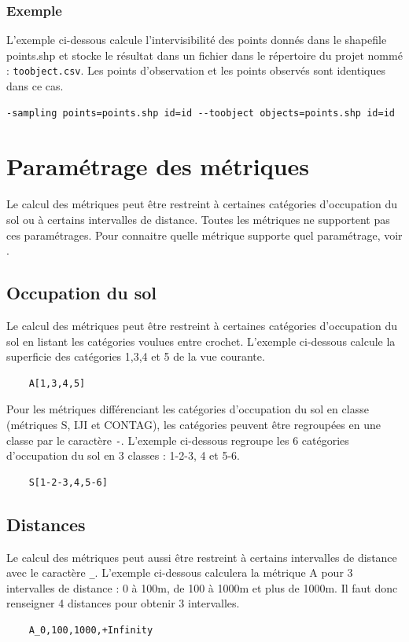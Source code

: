 \documentclass{report}
\begin{document}
\subsubsection{Exemple}
L'exemple ci-dessous calcule l'intervisibilité des points donnés dans le shapefile points.shp et stocke le résultat dans un fichier dans le répertoire du projet nommé : \verb|toobject.csv|. Les points d'observation et les points observés sont identiques dans ce cas.
\begin{Verbatim}
-sampling points=points.shp id=id --toobject objects=points.shp id=id
\end{Verbatim}



\section{Paramétrage des métriques}
\label{param_metrics_cli}
Le calcul des métriques peut être restreint à certaines catégories d'occupation du sol ou à certains intervalles de distance. Toutes les métriques ne supportent pas ces paramétrages. Pour connaitre quelle métrique supporte quel paramétrage, voir .

\subsection{Occupation du sol}
Le calcul des métriques peut être restreint à certaines catégories d'occupation du sol en listant les catégories voulues entre crochet. L'exemple ci-dessous calcule la superficie des catégories 1,3,4 et 5 de la vue courante.
\begin{Verbatim}
	A[1,3,4,5]
\end{Verbatim}

Pour les métriques différenciant les catégories d'occupation du sol en classe (métriques S, IJI et CONTAG), les catégories peuvent être regroupées en une classe par le caractère \verb|-|. L'exemple ci-dessous regroupe les 6 catégories d'occupation du sol en 3 classes : 1-2-3, 4 et 5-6.
\begin{Verbatim}
	S[1-2-3,4,5-6]
\end{Verbatim}

\subsection{Distances}
Le calcul des métriques peut aussi être restreint à certains intervalles de distance avec le caractère \verb|_|. L'exemple ci-dessous calculera la métrique A pour 3 intervalles de distance : 0 à 100m, de 100 à 1000m et plus de 1000m. Il faut donc renseigner 4 distances pour obtenir 3 intervalles.
\begin{Verbatim}
	A_0,100,1000,+Infinity
\end{Verbatim}
\end{document}
